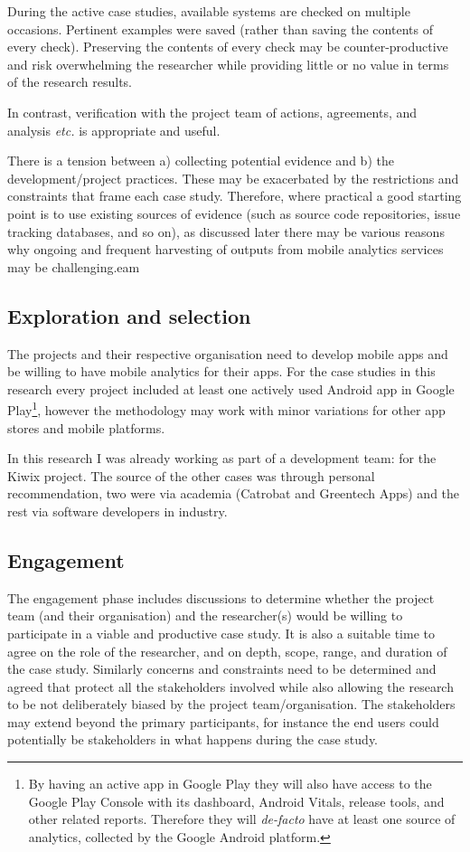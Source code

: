 During the active case studies, available systems are checked on multiple occasions. Pertinent examples were saved (rather than saving the contents of every check). Preserving the contents of every check may be counter-productive and risk overwhelming the researcher while providing little or no value in terms of the research results. 

In contrast, verification with the project team of actions, agreements, and analysis \emph{etc.} is appropriate and useful.

There is a tension between a) collecting potential evidence and b) the development/project practices. These may be exacerbated by the restrictions and constraints that frame each case study. Therefore, where practical a good starting point is to use existing sources of evidence (such as source code repositories, issue tracking databases, and so on), as discussed later there may be various reasons why ongoing and frequent harvesting of outputs from mobile analytics services may be challenging.eam

\subsection{Exploration and selection}
The projects and their respective organisation need to develop mobile apps and be willing to have mobile analytics for their apps. For the case studies in this research every project included at least one actively used Android app in Google Play\footnote{By having an active app in Google Play they will also have access to the Google Play Console with its dashboard, Android Vitals, release tools, and other related reports. Therefore they will \emph{de-facto} have at least one source of analytics, collected by the Google Android platform.}, however the methodology may work with minor variations for other app stores and mobile platforms.

In this research I was already working as part of a development team: for the Kiwix project. The source of the other cases was through personal recommendation, two were via academia (Catrobat and Greentech Apps) and the rest via software developers in industry.

\subsection{Engagement}
The engagement phase includes discussions to determine whether the project team (and their organisation) and the researcher(s) would be willing to participate in a viable and productive case study. It is also a suitable time to agree on the role of the researcher, and on depth, scope, range, and duration of the case study. Similarly concerns and constraints need to be determined and agreed that protect all the stakeholders involved while also allowing the research to be not deliberately biased by the project team/organisation. The stakeholders may extend beyond the primary participants, for instance the end users could potentially be stakeholders in what happens during the case study.

